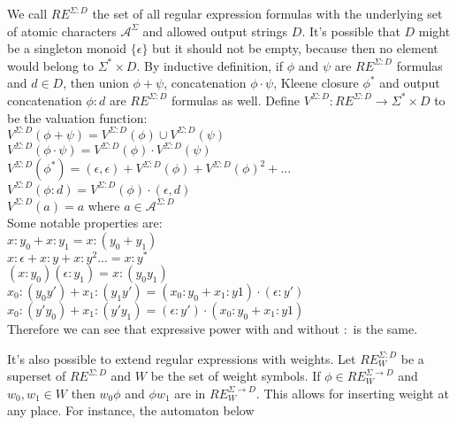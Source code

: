 We call  $RE^{\Sigma:D}$ the set of all regular expression formulas with the underlying set of atomic characters $\mathcal{A}^\Sigma$ and allowed output strings $D$. It's possible that $D$ might be a singleton monoid $\{\epsilon \}$ but it should not be empty, because then no element would belong to $\Sigma^* \times D$. By inductive definition, if $\phi$ and $\psi$  are $RE^{ \Sigma:D}$  formulas and $d \in D$, then union $\phi + \psi$, concatenation $\phi \cdot \psi$, Kleene closure $\phi^*$ and output concatenation $\phi : d$ are $RE^{ \Sigma:D}$ formulas as well.  Define $V^{\Sigma:D}:RE^{\Sigma:D} \rightarrow \Sigma^* \times D$ to be the valuation function:  \\
$V^{\Sigma:D}(\phi + \psi) = V^{\Sigma:D}(\phi) \cup V^{\Sigma:D}(\psi)$ \\
$V^{\Sigma:D}(\phi \cdot \psi) = V^{\Sigma:D}(\phi) \cdot  V^{\Sigma:D}(\psi)$ \\
$V^{\Sigma:D}(\phi^*) = (\epsilon,\epsilon) + V^{\Sigma:D}(\phi) + V^{\Sigma:D}(\phi)^2 + ...$ \\
$V^{\Sigma:D}(\phi : d) = V^{\Sigma:D}(\phi)  \cdot (\epsilon,d)$ \\
$V^{\Sigma:D}(a) = a$ where $a\in\mathcal{A}^{\Sigma:D}$ \\
Some notable properties are: \\
$x:y_0 +x:y_1 = x:(y_0+y_1)$ \\
$x:\epsilon+x:y+x:y^2...=x:y^*$ \\
$(x:y_0)(\epsilon:y_1)  = x:(y_0y_1)$\\
$x_0:(y_0y')+x_1:(y_1y') = (x_0:y_0+x_1:y1)\cdot(\epsilon:y')$ \\
$x_0:(y'y_0)+x_1:(y'y_1) = (\epsilon:y')\cdot(x_0:y_0+x_1:y1)$  \\
Therefore we can see that expressive power with and without $:$ is the same. 

It's also possible to extend regular expressions with weights. Let $RE_W^{\Sigma: D}$ be a superset of $RE^{\Sigma: D}$ and $W$ be the set of weight symbols. If $\phi\in RE_W^{\Sigma\rightarrow D}$ and $w_0,w_1\in W$ then $w_0 \phi $ and  $\phi w_1 $ are in $RE_W^{\Sigma\rightarrow D}$. This allows for inserting weight at any place. For instance, the automaton below

